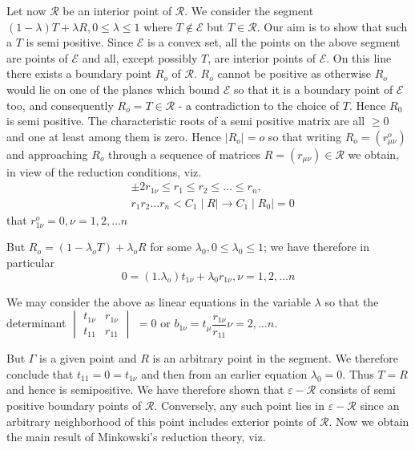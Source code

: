 	Let now $\mathscr{R}$  be an interior point of $ \mathscr{R}
        $. We consider the segment $ (1- \lambda) T + \lambda R,   0
        \leq \lambda \leq 1  $ where  $ T \not\in \mathscr{E} $ but $ T
        \in \mathscr{R} $. Our aim is to  show  that such a $ T $ is
        semi positive. Since $ \mathscr{E} $ is a convex set, all the
        points on the above segment are points of $ \mathscr{E} $ and
        all, except possibly $ T $, are interior points of  $
        \mathscr{E} $. On this line there  exists a boundary point
        $R_o $ of $ \mathscr{R} $. $R_o$ cannot be positive as
        otherwise  $R_o$ would  lie on one of the planes which bound $
        \mathscr{E}$ so that it is a boundary point of $ \mathscr{E} $
        too, and consequently $ R_o  = T \in \mathscr{R} $ - a
        contradiction to the choice of $T$. Hence $R_0$ is semi
        positive. The characteristic roots of a semi positive matrix
        are all $ \ge 0 $ and one at least among them is zero. Hence $
        \mid R_o \mid = o $ so that writing $ R_o = (r^o_{\mu \nu } )
        $  and approaching  $R_o $ through a sequence of matrices $R =
        ( r_{\mu \nu} )  \in \mathscr{R} $  we obtain, in view  of the
        reduction conditions, viz. 
\begin{align*}
&\pm 2 r_{1 \nu } \leq r_1 \leq r_2 \leq \ldots \leq r_n,\\
&r_1 r_2 \ldots r_n  < C_1 \mid R \mid \rightarrow  C_1 \mid R_0 \mid
  = 0 
 \end{align*} 
 that $ r^o_{1 \nu} = 0,  \nu = 1,2, \ldots n $
 
 But $ R_o = ( 1-\lambda_o T ) + \lambda_o R $ for some $ \lambda_0, 0
 \leq \lambda_0 \leq 1 $; we have therefore in particular  
 $$
 0 = ( 1. \lambda_o ) t_{1 \nu} + \lambda_0r_{1 \nu},   \nu = 1, 2,
 \ldots n 
 $$
 
We may consider the above as linear equations  in the variable $
\lambda $ so  that the determinant $ \begin{vmatrix} t_{1 \nu} & r_{1
    \nu} \\ t_{1 1} & r_{1 1} \end{vmatrix}$ $= 0$ or $b_{1\nu}= t_\mu
\dfrac{ r_{1 \nu}}{r_{1 1}}    \nu =2, \ldots n $. 

\setcounter{pageoriginal}{42}
But $ \Gamma $ is a given point and $R $ is an arbitrary point in the
segment. We therefore conclude that $ t_{1 1} = 0 = t_{ 1 \nu } $ and
then from an earlier equation $ \lambda_0 = 0 $. Thus $T =R$ and hence 
is semi\pageoriginale positive. We have therefore shown that $ \varepsilon -
\mathscr{R} $ consists of  semi positive boundary points of $
\mathscr{R} $. Conversely, any such point lies in  $\varepsilon -
\mathscr{R} $  since an arbitrary neighborhood of this point includes
exterior points  of $\mathscr{R}$. Now we obtain the main result of
Minkowski's reduction theory, viz. 

